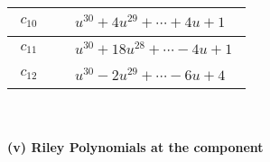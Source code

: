 \documentclass[1p]{elsarticle_modified}
\theoremstyle{definition}
\begin{document}
\begin{tabular}{m{50pt}|m{274pt}}
\hline $$\begin{aligned}c_{10}\end{aligned}$$&$\begin{aligned}
&u^{30}+4 u^{29}+\cdots+4 u+1
\end{aligned}$\\
\hline $$\begin{aligned}c_{11}\end{aligned}$$&$\begin{aligned}
&u^{30}+18 u^{28}+\cdots-4 u+1
\end{aligned}$\\
\hline $$\begin{aligned}c_{12}\end{aligned}$$&$\begin{aligned}
&u^{30}-2 u^{29}+\cdots-6 u+4
\end{aligned}$\\
\hline
\end{tabular}\\~\\
\newpage\renewcommand{\arraystretch}{1}
\flushleft \textbf{(v) Riley Polynomials at the component}\newline \\
\end{document}
